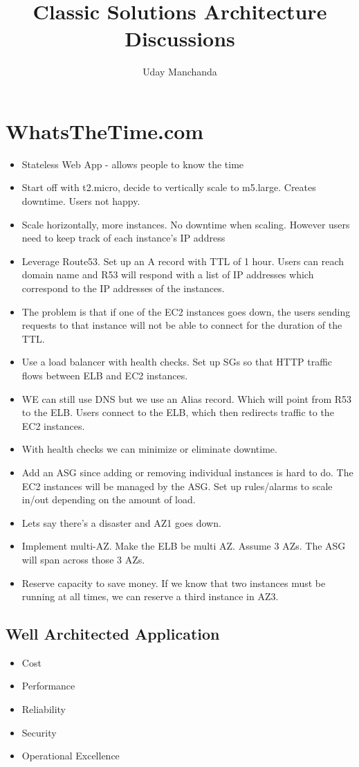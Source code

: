 \documentclass[]{scrartcl}
\title{Classic Solutions Architecture Discussions}
\author{Uday Manchanda}
\begin{document}
\maketitle

\section{WhatsTheTime.com}
\begin{itemize}
	\item Stateless Web App - allows people to know the time
	\item Start off with t2.micro, decide to vertically scale to m5.large. Creates downtime. Users not happy. 
	\item Scale horizontally, more instances. No downtime when scaling. However users need to keep track of each instance's IP address
	\item Leverage Route53. Set up an A record with TTL of 1 hour. Users can reach domain name and R53 will respond with a list of IP addresses which correspond to the IP addresses of the instances. 
	\item The problem is that if one of the EC2 instances goes down, the users sending requests to that instance will not be able to connect for the duration of the TTL. 
	\item Use a load balancer with health checks. Set up SGs so that HTTP traffic flows between ELB and EC2 instances. 
	\item WE can still use DNS but we use an Alias record. Which will point from R53 to the ELB. Users connect to the ELB, which then redirects traffic to the EC2 instances. 
	\item With health checks we can minimize or eliminate downtime. 
	\item Add an ASG since adding or removing individual instances is hard to do. The EC2 instances will be managed by the ASG. Set up rules/alarms to scale in/out depending on the amount of load. 
	\item Lets say there's a disaster and AZ1 goes down. 
	\item Implement multi-AZ. Make the ELB be multi AZ. Assume 3 AZs. The ASG will span across those 3 AZs. 
	\item Reserve capacity to save money. If we know that two instances must be running at all times, we can reserve a third instance in AZ3. 
\end{itemize}

\subsection{Well Architected Application}
\begin{itemize}
	\item Cost
	\item Performance
	\item Reliability
	\item Security
	\item Operational Excellence
\end{itemize}
\end{document}
